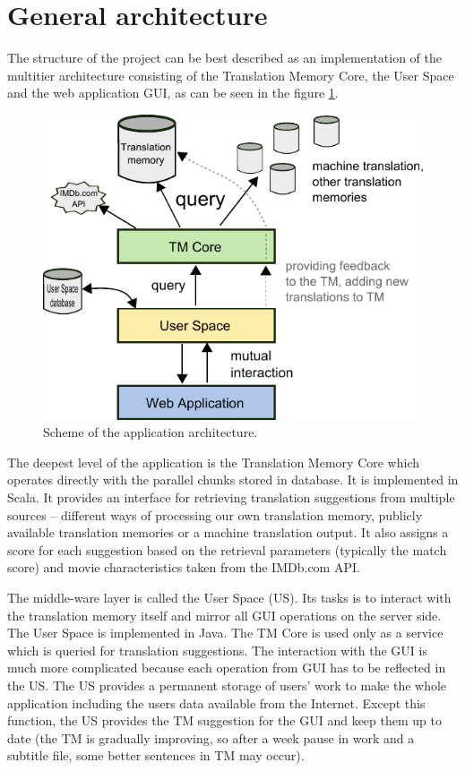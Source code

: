 \section{General architecture}
The structure of the project can be best described as an implementation of the multitier architecture consisting of the Translation Memory Core, the User Space and the web application GUI, as can be seen in the figure \ref{projectStructure:layers}.

\begin{figure}[h]
\begin{center}
\includegraphics{figures/scheme.pdf}
\end{center}
\caption{Scheme of the application architecture.}\label{projectStructure:layers}
\end{figure}

The deepest level of the application is the Translation Memory Core which operates directly with the parallel chunks stored in database. It is implemented in Scala. It provides an interface for retrieving translation suggestions from multiple sources -- different ways of processing our own translation memory, publicly available translation memories or a machine translation output. It also assigns a score for each suggestion based on the retrieval parameters (typically the match score) and movie characteristics taken from the IMDb.com API.

The middle-ware layer is called the User Space (US). Its tasks is to interact with the translation memory itself and mirror all GUI operations on the server side. The User Space is implemented in Java. The TM Core is used only as a service which is queried for translation suggestions. The interaction with the GUI is much more complicated because each operation from GUI has to be reflected in the US. The US provides a permanent storage of users' work to make the whole application including the users data available from the Internet. Except this function, the US provides the TM suggestion for the GUI and keep them up to date (the TM is gradually improving, so after a week pause in work and a subtitle file, some better sentences in TM may occur).

